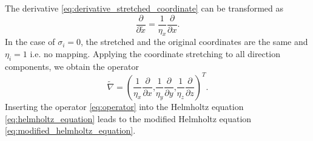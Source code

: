The derivative \cref{eq:derivative_stretched_coordinate} can be transformed as
\begin{equation}
	\frac{\partial}{\partial \tilde{x}} = \frac{1}{\eta_x}\frac{\partial}{\partial x}\text{.}
\end{equation}
In the case of $\sigma_i = 0$, the stretched and the original coordinates are the same and $\eta_i = 1$ i.e. no mapping. Applying the coordinate stretching to all direction components, we obtain the operator
\begin{equation}
	\tilde{\nabla} = \left(\frac{1}{\eta_x}\frac{\partial}{\partial x}\text{,}\frac{1}{\eta_y}\frac{\partial}{\partial y}\text{,}\frac{1}{\eta_z}\frac{\partial}{\partial z} \right)^T \text{.} \label{eq:operator}
\end{equation}
Inserting the operator \cref{eq:operator} into the Helmholtz equation \cref{eq:helmholtz_equation} leads to the modified Helmholtz equation \cref{eq:modified_helmholtz_equation}.

